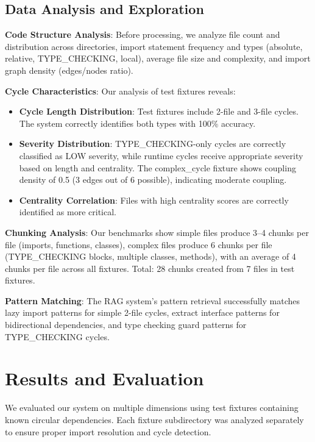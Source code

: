 \documentclass[paper=a4, fontsize=11pt]{scrartcl} %
\begin{document}
\subsection{Data Analysis and Exploration}

\textbf{Code Structure Analysis}: Before processing, we analyze file count and distribution across directories, import statement frequency and types (absolute, relative, TYPE\_CHECKING, local), average file size and complexity, and import graph density (edges/nodes ratio).

\textbf{Cycle Characteristics}: Our analysis of test fixtures reveals:
\begin{itemize}
    \item \textbf{Cycle Length Distribution}: Test fixtures include 2-file and 3-file cycles. The system correctly identifies both types with 100\% accuracy.
    \item \textbf{Severity Distribution}: TYPE\_CHECKING-only cycles are correctly classified as LOW severity, while runtime cycles receive appropriate severity based on length and centrality. The complex\_cycle fixture shows coupling density of 0.5 (3 edges out of 6 possible), indicating moderate coupling.
    \item \textbf{Centrality Correlation}: Files with high centrality scores are correctly identified as more critical.
\end{itemize}

\textbf{Chunking Analysis}: Our benchmarks show simple files produce 3--4 chunks per file (imports, functions, classes), complex files produce 6 chunks per file (TYPE\_CHECKING blocks, multiple classes, methods), with an average of 4 chunks per file across all fixtures. Total: 28 chunks created from 7 files in test fixtures.

\textbf{Pattern Matching}: The RAG system's pattern retrieval successfully matches lazy import patterns for simple 2-file cycles, extract interface patterns for bidirectional dependencies, and type checking guard patterns for TYPE\_CHECKING cycles.

\section{Results and Evaluation}

We evaluated our system on multiple dimensions using test fixtures containing known circular dependencies. Each fixture subdirectory was analyzed separately to ensure proper import resolution and cycle detection.
\end{document}
